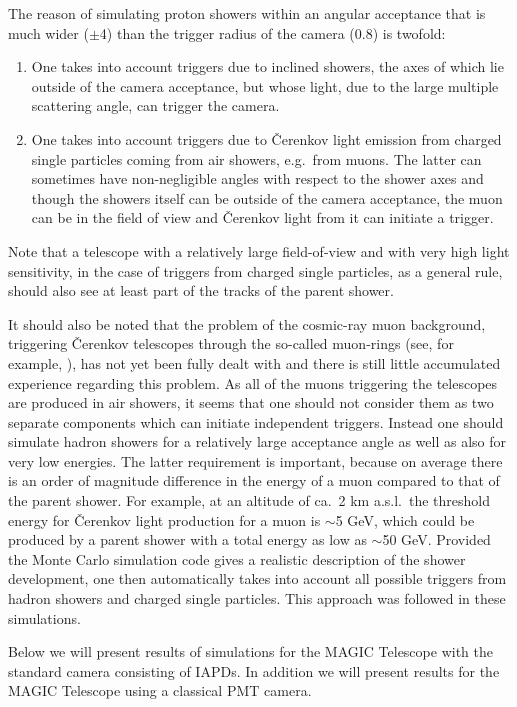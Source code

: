 \medskip The reason of simulating proton showers within an angular
acceptance that is much wider ($\pm$4\tdeg) than the  trigger radius of
the camera (0.8\tdeg) is twofold:
%
\begin{enumerate}
\item One takes into account triggers due to inclined showers, the
axes of which lie outside of the camera acceptance, but whose light,
due to the large multiple scattering angle, can 
trigger the camera.
%
\item One takes into account triggers due to \v{C}erenkov light emission
from charged single particles coming from air showers, e.g.\ from
muons. The latter can sometimes have non-negligible angles with respect to 
the
shower axes and though the showers itself can be outside of the camera
acceptance, the muon can be in the field of view and \v{C}erenkov
light from it can initiate a trigger.
\end{enumerate}

Note that 
a telescope with a relatively large field-of-view and with 
very high light sensitivity, in the case of triggers
from charged single particles, as a general rule, should also see at least
part of the tracks of the parent shower.
 
It should also be noted that the problem of the cosmic-ray muon background,
triggering \v{C}erenkov telescopes through the so-called muon-rings (see,
for example, \cite{vacanti:94}), has not yet been fully dealt with
and there is still little accumulated experience 
regarding this problem. As
all of the muons triggering the telescopes are produced in air
showers, it seems that one should not consider them as two separate
components which can initiate independent triggers. Instead one should
simulate hadron showers for a relatively large acceptance angle as well as 
also for very low energies. The latter requirement
is important, because on
average there is an order of magnitude difference in the energy of a
muon compared to that of the parent shower. For example, at an altitude of
ca.~2 km a.s.l.\ the threshold energy for \v{C}erenkov light
production for a muon is $\sim$5 GeV, which could
be produced by a parent shower with a total energy
as low as $\sim$50 GeV. Provided the Monte Carlo
simulation code gives a realistic description of the shower
development, one then automatically takes into account all possible
triggers from hadron showers and charged single particles.
This approach was followed
in these simulations.

Below we will present results of simulations for the MAGIC Telescope
with the standard camera consisting of IAPDs.  In addition we will
present results for the MAGIC Telescope using a classical PMT camera.

